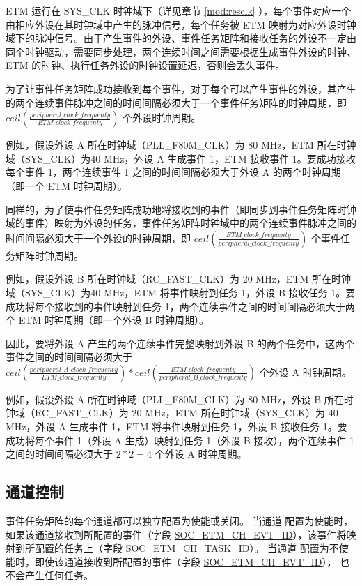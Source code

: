 \documentclass[main\_\_CN.tex]{subfiles}
\begin{document}
ETM 运行在 SYS\_CLK 时钟域下（详见章节 \ref{mod:resclk} \textit{}），每个事件对应一个由相应外设在其时钟域中产生的脉冲信号，每个任务被 ETM 映射为对应外设时钟域下的脉冲信号。由于产生事件的外设、事件任务矩阵和接收任务的外设不一定由同个时钟驱动，需要同步处理，两个连续时间之间需要根据生成事件外设的时钟、ETM 的时钟、执行任务外设的时钟设置延迟，否则会丢失事件。

为了让事件任务矩阵成功接收到每个事件，对于每个可以产生事件的外设，其产生的两个连续事件脉冲之间的时间间隔必须大于一个事件任务矩阵的时钟周期，即
$ceil(\frac{peripheral\_clock\_frequenty }{ETM\_clock\_frequenty})$ 个外设时钟周期。

例如，假设外设 A 所在时钟域（PLL\_F80M\_CLK）为 80 MHz，ETM 所在时钟域（SYS\_CLK）为40 MHz，外设 A 生成事件 1，ETM 接收事件 1。要成功接收每个事件 1，两个连续事件 1 之间的时间间隔必须大于外设 A 的两个时钟周期（即一个 ETM 时钟周期）。

同样的，为了使事件任务矩阵成功地将接收到的事件（即同步到事件任务矩阵时钟域的事件）映射为外设的任务，事件任务矩阵时钟域中的两个连续事件脉冲之间的时间间隔必须大于一个外设的时钟周期，即 $ceil(\frac{ETM\_clock\_frequenty}{peripheral\_clock\_frequenty})$ 个事件任务矩阵时钟周期。

例如，假设外设 B 所在时钟域（RC\_FAST\_CLK）为 20 MHz，ETM 所在时钟域（SYS\_CLK）为40 MHz，ETM 将事件映射到任务 1，外设 B 接收任务 1。要成功将每个接收到的事件映射到任务 1，两个连续事件之间的时间间隔必须大于两个 ETM 时钟周期（即一个外设 B 时钟周期）。

因此，要将外设 A 产生的两个连续事件完整映射到外设 B 的两个任务中，这两个事件之间的时间间隔必须大于$ceil(\frac{peripheral\_A\_clock\_frequenty}{ETM\_clock\_frequenty })*ceil(\frac{ETM\_clock\_frequenty}{peripheral\_B\_clock\_frequenty})$ 个外设 A 时钟周期。

例如，假设外设 A 所在时钟域（PLL\_F80M\_CLK）为 80 MHz，外设 B 所在时钟域（RC\_FAST\_CLK）为 20 MHz，ETM 所在时钟域（SYS\_CLK）为 40 MHz，外设 A 生成事件 1，ETM 将事件映射到任务 1，外设 B 接收任务 1。要成功将每个事件 1（外设 A 生成）映射到任务 1（外设 B 接收），两个连续事件 1 之间的时间间隔必须大于 $2*2=4$ 个外设 A 时钟周期。

\subsection{通道控制}
\label{sec:evntaskmatrix-channel-enable}

事件任务矩阵的每个通道都可以独立配置为使能或关闭。 当通道 配置为使能时，如果该通道接收到所配置的事件（字段 \hyperref[fielddesc:SOCETMCH0EVTID]{SOC\_ETM\_CH\_EVT\_ID}），该事件将映射到所配置的任务上（字段 \hyperref[fielddesc:SOCETMCH0TASKID]{SOC\_ETM\_CH\_TASK\_ID}）。 当通道 配置为不使能时，即使该通道接收到所配置的事件（字段 \hyperref[fielddesc:SOCETMCH0EVTID]{SOC\_ETM\_CH\_EVT\_ID}）， 也不会产生任何任务。
\end{document}
